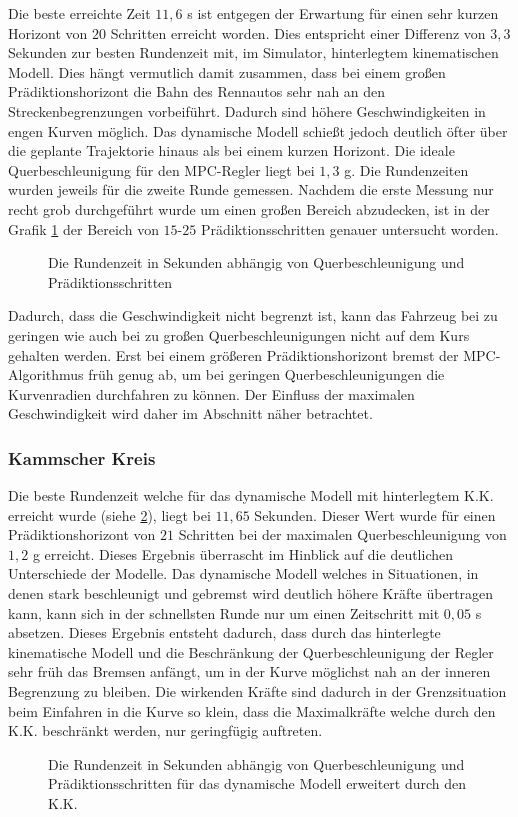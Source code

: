 \documentclass{like}
\begin{document}
Die beste erreichte Zeit $11,6$ s ist entgegen der Erwartung für einen sehr kurzen Horizont von $20$ Schritten erreicht worden. Dies entspricht einer Differenz von $3,3$ Sekunden zur besten Rundenzeit mit, im Simulator, hinterlegtem kinematischen Modell. Dies hängt vermutlich damit zusammen, dass bei einem großen Prädiktionshorizont die Bahn des Rennautos sehr nah an den Streckenbegrenzungen vorbeiführt. Dadurch sind höhere Geschwindigkeiten in engen Kurven möglich. Das dynamische Modell schießt jedoch deutlich öfter über die geplante Trajektorie hinaus als bei einem kurzen Horizont. Die ideale Querbeschleunigung für den \ac{MPC}-Regler liegt bei $1,3$ g. Die Rundenzeiten wurden jeweils für die zweite Runde gemessen. Nachdem die erste Messung nur recht grob durchgeführt wurde um einen großen Bereich abzudecken, ist in der Grafik \ref{fig:betaMaxFine} der Bereich von $15$-$25$ Prädiktionsschritten genauer untersucht worden.

\begin{figure}[ht!]
	\centering
	 
	\caption{Die Rundenzeit in Sekunden abhängig von Querbeschleunigung und Prädiktionsschritten}
	\label{fig:betaMaxFine}
\end{figure}

Dadurch, dass die Geschwindigkeit nicht begrenzt ist, kann das Fahrzeug bei zu geringen wie auch bei zu großen Querbeschleunigungen nicht auf dem Kurs gehalten werden. Erst bei einem größeren Prädiktionshorizont bremst der \ac{MPC}-Algorithmus früh genug ab, um bei geringen Querbeschleunigungen die Kurvenradien durchfahren zu können. Der Einfluss der maximalen Geschwindigkeit wird daher im Abschnitt näher betrachtet.

\subsubsection{Kammscher Kreis}
Die beste Rundenzeit welche für das dynamische Modell mit hinterlegtem \ac{K.K.} erreicht wurde (siehe \ref{fig:betaMaxFineKam}), liegt bei $11,65$ Sekunden. Dieser Wert wurde für einen Prädiktionshorizont von $21$ Schritten bei der maximalen Querbeschleunigung von $1,2$ g erreicht. Dieses Ergebnis überrascht im Hinblick auf die deutlichen Unterschiede der Modelle. Das dynamische Modell welches in Situationen, in denen stark beschleunigt und gebremst wird deutlich höhere Kräfte übertragen kann, kann sich in der schnellsten Runde nur um einen Zeitschritt mit $0,05$ s absetzen. Dieses Ergebnis entsteht dadurch, dass durch das hinterlegte kinematische Modell und die Beschränkung der Querbeschleunigung der Regler sehr früh das Bremsen anfängt, um in der Kurve möglichst nah an der inneren Begrenzung zu bleiben. Die wirkenden Kräfte sind dadurch in der Grenzsituation beim Einfahren in die Kurve so klein, dass die Maximalkräfte welche durch den \ac{K.K.} beschränkt werden, nur geringfügig auftreten.
\begin{figure}
	\centering
	 
	\caption{Die Rundenzeit in Sekunden abhängig von Querbeschleunigung und Prädiktionsschritten für das dynamische Modell erweitert durch den \ac{K.K.}}
	\label{fig:betaMaxFineKam}
\end{figure}
\end{document}

